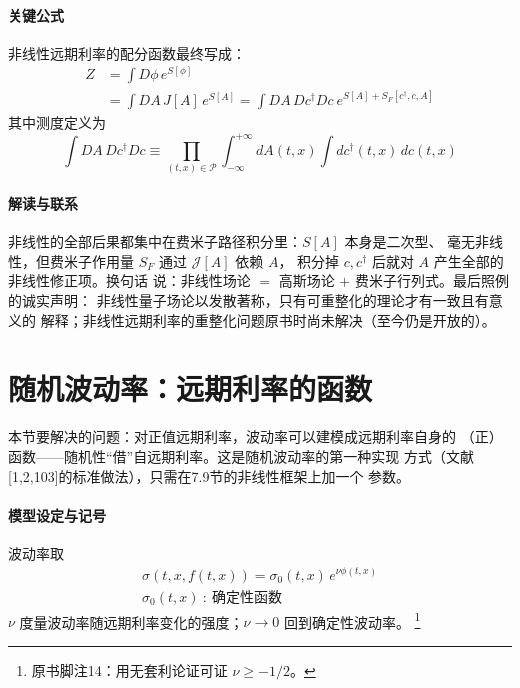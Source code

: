 \paragraph{关键公式}
非线性远期利率的配分函数最终写成：
\begin{align*}
Z&=\int D\phi\,e^{S[\phi]}\\
&=\int DA\,J[A]\,e^{S[A]}
=\int DA\,Dc^{\dagger}Dc\ e^{S[A]+S_F[c^{\dagger},c,A]}
\tag{7.55}
\end{align*}
其中测度定义为
\begin{equation*}
\int DA\,Dc^{\dagger}Dc\equiv
\prod_{(t,x)\in\mathcal{P}}\int_{-\infty}^{+\infty}dA(t,x)
\int dc^{\dagger}(t,x)\,dc(t,x)
\end{equation*}
\paragraph{解读与联系}
非线性的全部后果都集中在费米子路径积分里：$S[A]$ 本身是二次型、
毫无非线性，但费米子作用量 $S_F$ 通过 $\mathcal{J}[A]$ 依赖 $A$，
积分掉 $c,c^{\dagger}$ 后就对 $A$ 产生全部的非线性修正项。换句话
说：非线性场论 $=$ 高斯场论 $+$ 费米子行列式。最后照例的诚实声明：
非线性量子场论以发散著称，只有可重整化的理论才有一致且有意义的
解释；非线性远期利率的重整化问题原书时尚未解决（至今仍是开放的）。

\section{随机波动率：远期利率的函数}

本节要解决的问题：对正值远期利率，波动率可以建模成远期利率自身的
（正）函数——随机性“借”自远期利率。这是随机波动率的第一种实现
方式（文献[1,2,103]的标准做法），只需在7.9节的非线性框架上加一个
参数。

\paragraph{模型设定与记号}
波动率取
\begin{gather*}
\sigma(t,x,f(t,x))=\sigma_0(t,x)\,e^{\nu\phi(t,x)}\\
\sigma_0(t,x)\ :\ \text{确定性函数}
\tag{7.56}
\end{gather*}
$\nu$ 度量波动率随远期利率变化的强度；$\nu\to0$ 回到确定性波动率。
\footnote{原书脚注14：用无套利论证可证 $\nu\geq-1/2$。}

